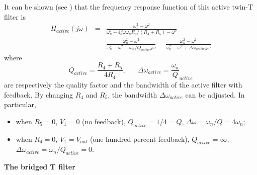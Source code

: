 It can be shown (see )
that the frequency response function of this active twin-T filter is
\begin{eqnarray}
H_{active}(j\omega)
&=&\frac{\omega_n^2-\omega^2}{\omega_n^2+4j\omega\omega_n R_4/(R_4+R_5)-\omega^2}
\nonumber\\
&=&\frac{\omega_n^2-\omega^2}{\omega_n^2-\omega^2+\omega_n/Q_{active} j\omega}
=\frac{\omega_n^2-\omega^2}{\omega_n^2-\omega^2+\Delta\omega_{active} j\omega}
\nonumber
\end{eqnarray}
where 
\[
Q_{active}=\frac{R_4+R_5}{4R_4},\;\;\;\;\;\;
\Delta\omega_{active}=\frac{\omega_n}{Q}_{active}
\]
are respectively the quality factor and the bandwidth of the active 
filter with feedback. By changing $R_4$ and $R_5$, the bandwidth 
$\Delta\omega_{active}$ can be adjusted. In particular, 
\begin{itemize}
\item when $R_5=0$, $V_1=0$ (no feedback), $Q_{active}=1/4=Q$, 
  $\Delta\omega=\omega_n/Q=4\omega_n$; 
\item when $R_4=0$, $V_1=V_{out}$ (one hundred percent feedback), 
  $Q_{active}=\infty$, $\Delta\omega_{active}=\omega_n/Q_{active}=0$.
\end{itemize}


{\bf The bridged T filter}

